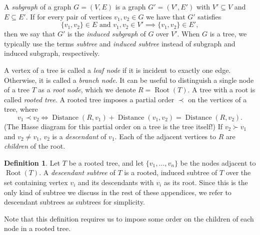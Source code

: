 \documentclass{article}
\theoremstyle{definition}
\newtheorem{defin}[thm]{Definition}
\DeclareMathOperator{\Root}{Root}
\DeclareMathOperator{\dist}{Distance}
\begin{document}
    A \emph{subgraph} of a graph $G = (V,E)$ is a graph $G' = (V',E')$ with $V' \subseteq V$ and $E \subseteq E'$. If for every pair of vertices $v_1,v_2 \in G$ we have that $G'$ satisfies \[\{v_1,v_2\} \in E \text{ and } v_1,v_2 \in V' \implies \{v_1,v_2\} \in E',\] 
    then we say that $G'$ is the \emph{induced subgraph} of $G$ over $V'$. When $G$ is a tree, we typically use the terms \emph{subtree} and \emph{induced subtree} instead of subgraph and induced subgraph, respectively.


    A vertex of a tree is called a \emph{leaf node} if it is incident to exactly one edge. Otherwise, it is called a \emph{branch node}. It can be useful to distinguish a single node of a tree $T$ as a \emph{root node}, which we denote $R = \Root(T)$. A tree with a root is called \emph{rooted tree}. A rooted tree imposes a partial order $\prec$ on the vertices of a tree, where 
    \[ v_1 \prec v_2 \iff \dist(R, v_1) + \dist(v_1, v_2) = \dist(R, v_2).\] 
    (The Hasse diagram for this partial order on a tree is the tree itself!) If $v_2 \succ v_1$ and $v_2 \neq v_1$, $v_2$ is a \emph{descendant} of $v_1$. Each of the adjacent vertices to $R$ are \emph{children} of the root.


\begin{defin}
     Let $T$ be a rooted tree, and let $\{v_1, \ldots, v_n\}$ be the nodes adjacent to $\Root(T)$. A \emph{descendant subtree} of $T$ is a rooted, induced subtree of $T$ over the set containing vertex $v_i$ and its descendants with $v_i$ as its root. Since this is the only kind of subtree we discuss in the rest of these appendices, we refer to descendant subtrees as subtrees for simplicity. 
\end{defin}

Note that this definition requires us to impose some order on the children of each node in a rooted tree.
\end{document}

